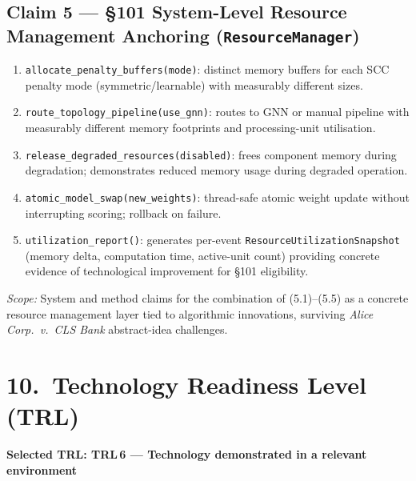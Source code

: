 \documentclass[12pt,a4paper]{article}
\begin{document}
\subsection{Claim 5 --- \S101 System-Level Resource Management Anchoring
            (\texttt{ResourceManager})}
\begin{enumerate}[label=5.\arabic*,leftmargin=2.5em,noitemsep]
  \item \texttt{allocate\_penalty\_buffers(mode)}: distinct memory buffers for each SCC
        penalty mode (symmetric/learnable) with measurably different sizes.
  \item \texttt{route\_topology\_pipeline(use\_gnn)}: routes to GNN or manual pipeline
        with measurably different memory footprints and processing-unit utilisation.
  \item \texttt{release\_degraded\_resources(disabled)}: frees component memory during
        degradation; demonstrates reduced memory usage during degraded operation.
  \item \texttt{atomic\_model\_swap(new\_weights)}: thread-safe atomic weight update
        without interrupting scoring; rollback on failure.
  \item \texttt{utilization\_report()}: generates per-event \texttt{ResourceUtilizationSnapshot}
        (memory delta, computation time, active-unit count) providing concrete evidence of
        technological improvement for \S101 eligibility.
\end{enumerate}
\textit{Scope:} System and method claims for the combination of (5.1)--(5.5) as a concrete
resource management layer tied to algorithmic innovations, surviving
\textit{Alice Corp.\ v.\ CLS Bank} abstract-idea challenges.

\section{10.\ Technology Readiness Level (TRL)}

\textbf{Selected TRL: TRL\,6 --- Technology demonstrated in a relevant environment}
\end{document}

